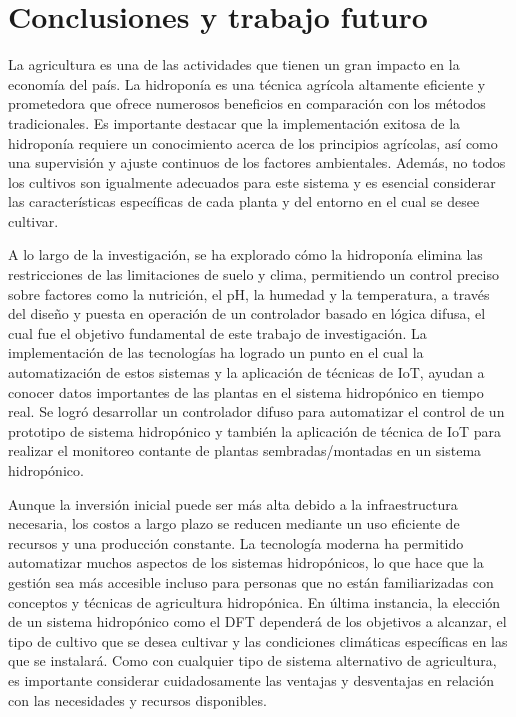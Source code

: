 


\chapter{Conclusiones y trabajo futuro} 
\label{chap:CyTF}


La agricultura es una de las actividades que tienen un gran impacto en la economía del país. La hidroponía es una técnica agrícola altamente eficiente y prometedora que ofrece numerosos beneficios en comparación con los métodos tradicionales. Es importante destacar que la implementación exitosa de la hidroponía requiere un conocimiento acerca de los principios agrícolas, así como una supervisión y ajuste continuos de los factores ambientales. Además, no todos los cultivos son igualmente adecuados para este sistema y es esencial considerar las características específicas de cada planta y del entorno en el cual se desee cultivar.

A lo largo de la investigación, se ha explorado cómo la hidroponía elimina las restricciones de las limitaciones de suelo y clima, permitiendo un control preciso sobre factores como la nutrición, el pH, la humedad y la temperatura, a través del diseño y puesta en operación de un controlador basado en lógica difusa, el cual fue el objetivo fundamental de este trabajo de investigación. La implementación de las tecnologías ha logrado un punto en el cual la automatización de estos sistemas y la aplicación de técnicas de IoT, ayudan a conocer datos importantes de las plantas en el sistema hidropónico en tiempo real. Se logró desarrollar un controlador difuso para automatizar el control de un prototipo de sistema hidropónico y también la aplicación de técnica de IoT para realizar el monitoreo contante de plantas sembradas/montadas en un sistema hidropónico.
   
Aunque la inversión inicial puede ser más alta debido a la infraestructura necesaria, los costos a largo plazo se reducen mediante un uso eficiente de recursos y una producción constante. La tecnología moderna ha permitido automatizar muchos aspectos de los sistemas hidropónicos, lo que hace que la gestión sea más accesible incluso para personas que no están familiarizadas con conceptos y técnicas de agricultura hidropónica.
En última instancia, la elección de un sistema hidropónico como el DFT dependerá de los objetivos a alcanzar, el tipo de cultivo que se desea cultivar y las condiciones climáticas específicas en las que se instalará. Como con cualquier tipo de sistema alternativo de agricultura, es importante considerar cuidadosamente las ventajas y desventajas en relación con las necesidades y recursos disponibles.
\newpage

